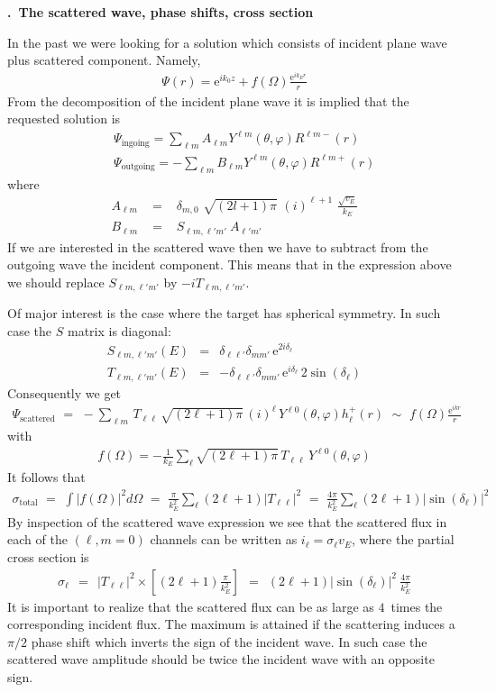 \documentclass[onecolumn,fleqn, 11pt]{revtex4}
\newcommand{\eexp}{\mathrm{e}^}
\newcommand{\tbox}[1]{\text{#1}}
\newcommand{\beq}{\begin{eqnarray}}
\newcommand{\eeq}{\end{eqnarray}}
\renewcommand{\thesubsection}{\arabic{subsection}}
\renewcommand{\thesubsubsection}{\arabic{subsubsection}}
\newcommand{\sheadC}[1]
{
\addtocounter{subsubsection}{1}
\vspace{5mm}
{\bf \thesubsection.\thesubsubsection \ #1}  
\nopagebreak
\phantomsection
}
\begin{document}
\sheadC{The scattered wave, phase shifts, cross section}


In the past we were looking for a solution which consists 
of incident plane wave plus scattered component. Namely, 
\beq
\Psi(r) = \eexp{ik_0z} + f(\Omega) \frac{\eexp{ik_E r}}{r}
\eeq
From the decomposition of the incident plane 
wave it is implied that the requested solution is 
\beq
&& \Psi_{\tbox{ingoing}} 
= \sum_{\ell m} A_{\ell m} Y^{\ell m}(\theta,\varphi) R^{\ell m-}(r) 
\\ \nonumber
&& \Psi_{\tbox{outgoing}} 
= -\sum_{\ell m} B_{\ell m} Y^{\ell m}(\theta,\varphi) R^{\ell m+}(r)
\eeq
where
\beq
A_{\ell m} \,\, &=& \,\,  
\delta_{m,0} 
\,\, \sqrt{(2l+1)\pi} 
\,\, (i)^{\ell{+}1} 
\,\, \frac{\sqrt{v_E}}{k_E}
\\ \nonumber
B_{\ell m} \,\, &=& \,\,  
S_{\ell m,\ell' m'} \ A_{\ell' m'} 
\eeq
If we are interested in the scattered wave then 
we have to subtract from the outgoing wave 
the incident component. This means that 
in the expression above we should 
replace $S_{\ell m,\ell' m'}$ by $-iT_{\ell m,\ell' m'}$. 



Of major interest is the case where 
the target has spherical symmetry. 
In such case the $S$ matrix is diagonal: 
\beq
S_{\ell m,\ell' m'}(E) &=& 
\delta_{\ell\ell'}\delta_{mm'} 
\, \eexp{2i\delta_{\ell}}   
\\ \nonumber
T_{\ell m,\ell' m'}(E) &=&
- \delta_{\ell\ell'}\delta_{mm'}
\, \eexp{i\delta_{\ell}} \, 2\sin(\delta_{\ell})    
\eeq
Consequently we get 
\beq
\Psi_{\tbox{scattered}} 
\,\,=\,\, 
-\sum_{\ell m} \, T_{\ell\ell} \, 
\sqrt{(2\ell+1)\pi} \, (i)^{\ell} \, 
Y^{\ell 0}(\theta,\varphi) h_{\ell}^{+}(r)
\,\,\sim\,\, 
f(\Omega) \frac{\eexp{ikr}}{r}
\eeq
with 
\beq
f(\Omega)  = -\frac{1}{k_E} \sum_{\ell} \sqrt{(2\ell+1)\pi} 
\, T_{\ell\ell} \, Y^{\ell 0}(\theta,\varphi) 
\eeq
It follows that 
\beq
\sigma_{\tbox{total}} 
\,\,=\,\, 
\int |f(\Omega)|^2 d\Omega 
\,\,=\,\, 
\frac{\pi}{k_E^2} \sum_{\ell} (2\ell+1) |T_{\ell\ell}|^2   
\,\,=\,\,
\frac{4\pi}{k_E^2} \sum_{\ell} (2\ell+1) |\sin(\delta_{\ell})|^2  
\eeq
By inspection of the scattered wave expression 
we see that the scattered flux 
in each of the ${(\ell, m{=}0)}$ channels 
can be written as ${i_{\ell} = \sigma_{\ell}v_E}$,  
where the partial cross section is  
\beq
\sigma_{\ell} 
\ \ = \ \ 
|T_{\ell\ell}|^2 \times \left[ (2\ell+1) \frac{\pi}{k_E^2} \right] 
\ \ = \ \ 
(2\ell+1) |\sin(\delta_{\ell})|^2 \ \frac{4\pi}{k_E^2} 
\eeq
It is important to realize 
that the scattered flux can be 
as large as $4$~times the corresponding incident flux.
The maximum is attained if the scattering 
induces a $\pi/2$ phase shift which inverts 
the sign of the incident wave. In such case  
the scattered wave amplitude should be twice 
the incident wave with an opposite sign. 
\end{document}
